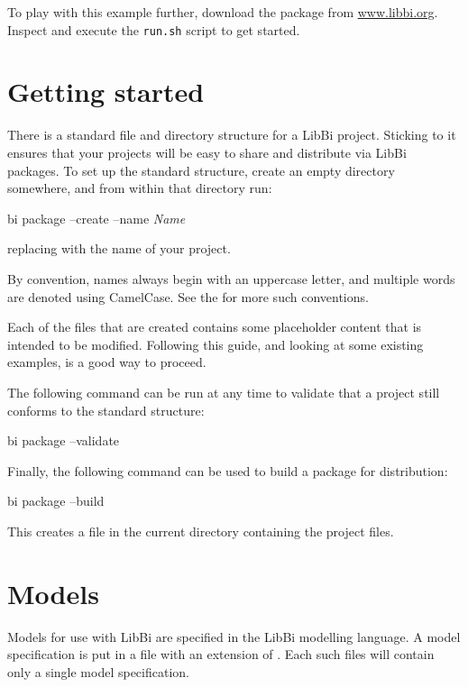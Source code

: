 To play with this example further, download the  package from
\url{www.libbi.org}. Inspect and execute the \texttt{run.sh} script to get
started.

\section{Getting started}\label{Getting_started}

There is a standard file and directory structure for a LibBi project. Sticking
to it ensures that your projects will be easy to share and distribute via
LibBi packages. To set up the standard structure, create an empty directory
somewhere, and from within that directory run:
\begin{cmdcode}
bi package --create --name \emph{Name}
\end{cmdcode}
replacing  with the name of your project.

\begin{tip}
By convention, names always begin with an uppercase letter, and multiple words
are denoted using CamelCase. See the  for
more such conventions.
\end{tip}

Each of the files that are created contains some placeholder content that is
intended to be modified. Following this guide, and looking at some existing
examples, is a good way to proceed.

The following command can be run at any time to validate that a project still
conforms to the standard structure:
\begin{cmdcode}
bi package --validate
\end{cmdcode}

Finally, the following command can be used to build a package for
distribution:
\begin{cmdcode}
bi package --build
\end{cmdcode}
This creates a  file in the current directory containing the
project files.

\section{Models\label{Models}}

Models for use with LibBi are specified in the LibBi modelling language. A
model specification is put in a file with an extension of . Each
such files will contain only a single model specification.


